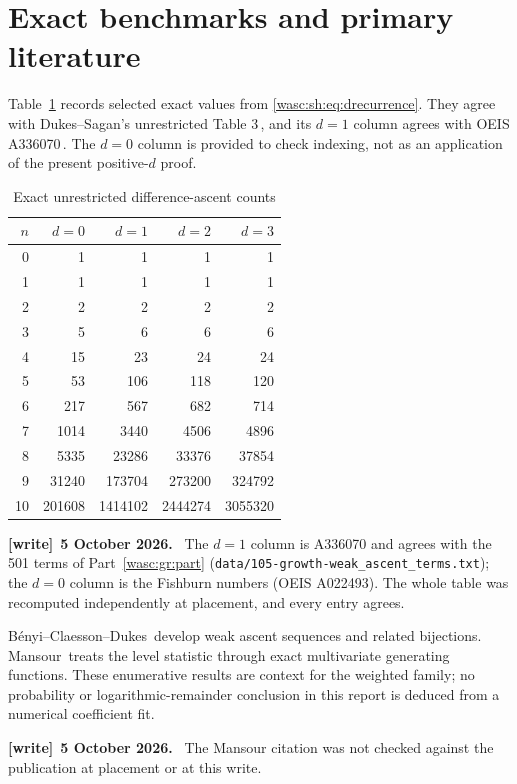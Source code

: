 \documentclass[11pt,a4paper]{article}
\newcommand{\file}[1]{\nolinkurl{#1}}
\theoremstyle{remark}\newtheorem{remark}[theorem]{Remark}
\numberwithin{equation}{section}
\newenvironment{writenote}[1][]{\par\smallskip\begingroup\small
 \noindent\textbf{[write]}\if\relax\detokenize{#1}\relax\else~\textbf{#1.}\fi\ }%
 {\par\endgroup\smallskip}
\begin{document}
\section{Exact benchmarks and primary literature}\label{wasc:sh:sec:literature}
Table~\ref{wasc:sh:tab:counts} records selected exact values from \eqref{wasc:sh:eq:drecurrence}. They agree with Dukes--Sagan's unrestricted Table 3\,\cite{dukes}, and its $d=1$ column agrees with OEIS A336070\,\cite{oeis}. The $d=0$ column is provided to check indexing, not as an application of the present positive-$d$ proof.
\begin{table}[ht]
\centering
\caption{Exact unrestricted difference-ascent counts}\label{wasc:sh:tab:counts}
\begin{tabular}{r r r r r}
\toprule
$n$ & $d=0$ & $d=1$ & $d=2$ & $d=3$\\
\midrule
0&1&1&1&1\\
1&1&1&1&1\\
2&2&2&2&2\\
3&5&6&6&6\\
4&15&23&24&24\\
5&53&106&118&120\\
6&217&567&682&714\\
7&1014&3440&4506&4896\\
8&5335&23286&33376&37854\\
9&31240&173704&273200&324792\\
10&201608&1414102&2444274&3055320\\
\bottomrule
\end{tabular}
\end{table}
\begin{writenote}[5 October 2026]
The $d=1$ column is A336070 and agrees with the 501 terms of Part~\ref{wasc:gr:part} (\file{data/105-growth-weak_ascent_terms.txt}); the $d=0$ column is the Fishburn numbers (OEIS A022493). The whole table was recomputed independently at placement, and every entry agrees.
\end{writenote}

B\'enyi--Claesson--Dukes\,\cite{benyi} develop weak ascent sequences and related bijections. Mansour\,\cite{mansour} treats the level statistic through exact multivariate generating functions. These enumerative results are context for the weighted family; no probability or logarithmic-remainder conclusion in this report is deduced from a numerical coefficient fit.
\begin{writenote}[5 October 2026]
The Mansour citation was not checked against the publication at placement or at this write.
\end{writenote}
\end{document}
